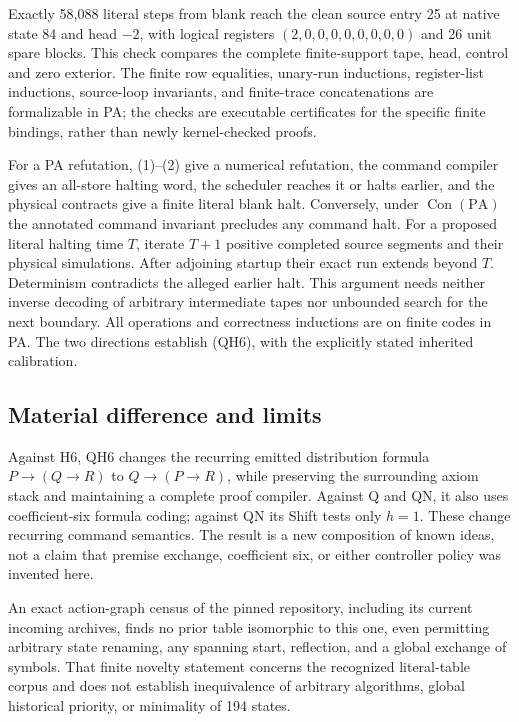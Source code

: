 Exactly 58,088 literal steps from blank reach the clean source entry
25 at native state 84 and head $-2$, with logical registers
$(2,0,0,0,0,0,0,0,0)$ and 26 unit spare blocks. This check compares
the complete finite-support tape, head, control and zero exterior.
The finite row equalities, unary-run inductions, register-list
inductions, source-loop invariants, and finite-trace concatenations
are formalizable in PA; the checks are executable certificates for
the specific finite bindings, rather than newly kernel-checked proofs.

For a PA refutation, (1)--(2) give a numerical refutation, the command
compiler gives an all-store halting word, the scheduler reaches it or
halts earlier, and the physical contracts give a finite literal blank
halt. Conversely, under $\operatorname{Con}(\mathrm{PA})$ the annotated
command invariant precludes any command halt. For a proposed literal
halting time $T$, iterate $T+1$ positive completed source segments and
their physical simulations. After adjoining startup their exact run
extends beyond $T$. Determinism contradicts the alleged earlier halt.
This argument needs neither inverse decoding of arbitrary intermediate
tapes nor unbounded search for the next boundary. All operations and
correctness inductions are on finite codes in PA. The two directions
establish (QH6), with the explicitly stated inherited calibration.

\subsection{Material difference and limits}

Against H6, QH6 changes the recurring emitted distribution formula
$P\to(Q\to R)$ to $Q\to(P\to R)$, while preserving the surrounding
axiom stack and maintaining a complete proof compiler. Against Q and
QN, it also uses coefficient-six formula coding; against QN its Shift
tests only $h=1$. These change recurring command semantics. The result
is a new composition of known ideas, not a claim that premise exchange,
coefficient six, or either controller policy was invented here.

An exact action-graph census of the pinned repository, including its
current incoming archives, finds no prior table isomorphic to this one,
even permitting arbitrary state renaming, any spanning start, reflection,
and a global exchange of symbols. That finite novelty statement concerns
the recognized literal-table corpus and does not establish inequivalence
of arbitrary algorithms, global historical priority, or minimality of
194 states.
